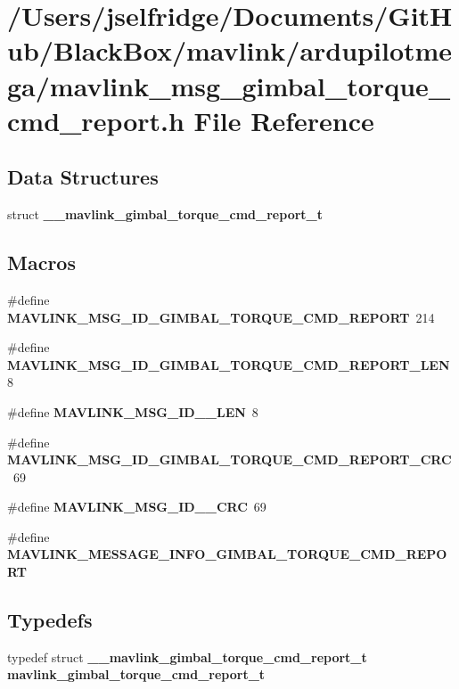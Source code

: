 \section{/\+Users/jselfridge/\+Documents/\+Git\+Hub/\+Black\+Box/mavlink/ardupilotmega/mavlink\+\_\+msg\+\_\+gimbal\+\_\+torque\+\_\+cmd\+\_\+report.h File Reference}
\label{mavlink__msg__gimbal__torque__cmd__report_8h}
\subsection*{Data Structures}
\begin{DoxyCompactItemize}
\item 
struct \textbf{ \+\_\+\+\_\+mavlink\+\_\+gimbal\+\_\+torque\+\_\+cmd\+\_\+report\+\_\+t}
\end{DoxyCompactItemize}
\subsection*{Macros}
\begin{DoxyCompactItemize}
\item 
\#define \textbf{ M\+A\+V\+L\+I\+N\+K\+\_\+\+M\+S\+G\+\_\+\+I\+D\+\_\+\+G\+I\+M\+B\+A\+L\+\_\+\+T\+O\+R\+Q\+U\+E\+\_\+\+C\+M\+D\+\_\+\+R\+E\+P\+O\+RT}~214
\item 
\#define \textbf{ M\+A\+V\+L\+I\+N\+K\+\_\+\+M\+S\+G\+\_\+\+I\+D\+\_\+\+G\+I\+M\+B\+A\+L\+\_\+\+T\+O\+R\+Q\+U\+E\+\_\+\+C\+M\+D\+\_\+\+R\+E\+P\+O\+R\+T\+\_\+\+L\+EN}~8
\item 
\#define \textbf{ M\+A\+V\+L\+I\+N\+K\+\_\+\+M\+S\+G\+\_\+\+I\+D\+\_\+\_\+\+L\+EN}~8
\item 
\#define \textbf{ M\+A\+V\+L\+I\+N\+K\+\_\+\+M\+S\+G\+\_\+\+I\+D\+\_\+\+G\+I\+M\+B\+A\+L\+\_\+\+T\+O\+R\+Q\+U\+E\+\_\+\+C\+M\+D\+\_\+\+R\+E\+P\+O\+R\+T\+\_\+\+C\+RC}~69
\item 
\#define \textbf{ M\+A\+V\+L\+I\+N\+K\+\_\+\+M\+S\+G\+\_\+\+I\+D\+\_\+\_\+\+C\+RC}~69
\item 
\#define \textbf{ M\+A\+V\+L\+I\+N\+K\+\_\+\+M\+E\+S\+S\+A\+G\+E\+\_\+\+I\+N\+F\+O\+\_\+\+G\+I\+M\+B\+A\+L\+\_\+\+T\+O\+R\+Q\+U\+E\+\_\+\+C\+M\+D\+\_\+\+R\+E\+P\+O\+RT}
\end{DoxyCompactItemize}
\subsection*{Typedefs}
\begin{DoxyCompactItemize}
\item 
typedef struct \textbf{ \+\_\+\+\_\+mavlink\+\_\+gimbal\+\_\+torque\+\_\+cmd\+\_\+report\+\_\+t} \textbf{ mavlink\+\_\+gimbal\+\_\+torque\+\_\+cmd\+\_\+report\+\_\+t}
\end{DoxyCompactItemize}


